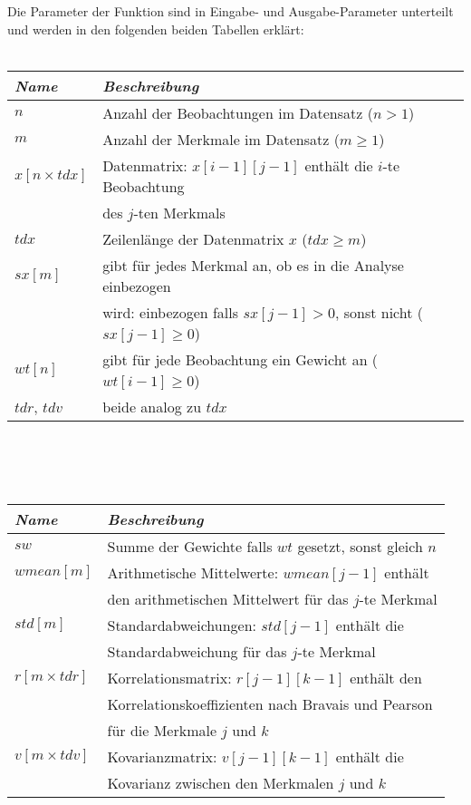 \noindent Die Parameter der Funktion sind in Eingabe- und Ausgabe-Parameter unterteilt und werden in den folgenden beiden Tabellen erklärt:\\

\\

\noindent \begin{tabular}[ht]{|l|l|}
  	\hline
  	\textit{Name} & \textit{Beschreibung}\\
  	\hline \hline
  	$n$ & Anzahl der Beobachtungen im Datensatz ($n > 1$)\\ \hline
  	$m$ & Anzahl der Merkmale im Datensatz ($m \geq 1$)\\ \hline
	$x[n \times tdx]$ & Datenmatrix: $x[i - 1][j - 1]$ enthält die $i$-te Beobachtung\\
	& des $j$-ten Merkmals\\ \hline
	$tdx$ & Zeilenlänge der Datenmatrix $x$ ($tdx \geq m$)\\ \hline
	$sx[m]$ & gibt für jedes Merkmal an, ob es in die Analyse einbezogen\\
	& wird: einbezogen falls $sx[j-1] > 0$, sonst nicht ($sx[j-1] \geq 0$)\\ \hline
	$wt[n]$ & gibt für jede Beobachtung ein Gewicht an ($wt[i-1] \geq 0$)\\ \hline
	$tdr$, $tdv$ & beide analog zu $tdx$\\
	\hline
\end{tabular}\\\\

\\
	
\noindent \begin{tabular}[ht]{|l|l|}
  	\hline
  	\textit{Name} & \textit{Beschreibung}\\
  	\hline \hline
	$sw$ & Summe der Gewichte falls $wt$ gesetzt, sonst gleich $n$\\ \hline
  	$wmean[m]$ & Arithmetische Mittelwerte: $wmean[j - 1]$ enthält\\
  	& den arithmetischen Mittelwert für das $j$-te Merkmal\\ \hline
  	$std[m]$ & Standardabweichungen: $std[j - 1]$ enthält die\\
  	& Standardabweichung für das $j$-te Merkmal\\ \hline
  	$r[m \times tdr]$ & Korrelationsmatrix: $r[j - 1][k - 1]$ enthält den\\
	& Korrelationskoeffizienten nach Bravais und Pearson\\
	& für die Merkmale $j$ und $k$\\ \hline
	$v[m \times tdv]$ & Kovarianzmatrix: $v[j - 1][k - 1]$ enthält die\\
	& Kovarianz zwischen den Merkmalen $j$ und $k$\\
  	\hline
\end{tabular}\\\\

